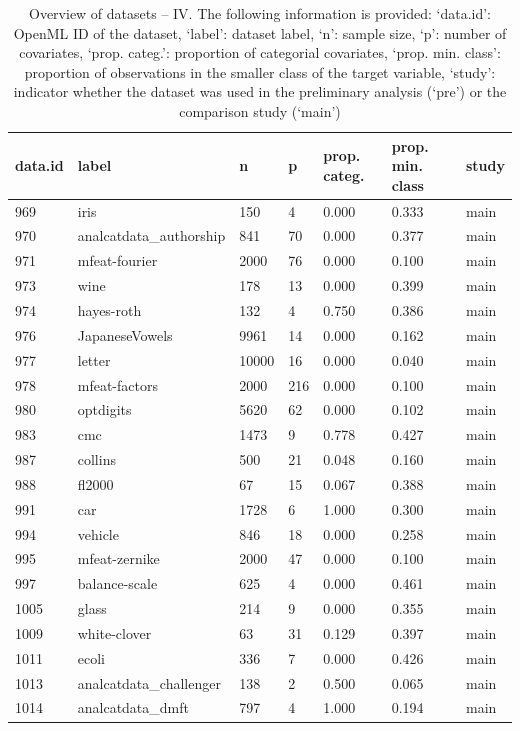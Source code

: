 \begin{table}[!htb]
\caption{Overview of datasets -- IV. The following information is provided: `data.id': OpenML ID of the dataset, `label': dataset label, `n': sample size, `p': number of covariates, `prop. categ.': proportion of categorial covariates, `prop. min. class': proportion of observations in the smaller class of the target variable, `study': indicator whether the dataset was used in the preliminary analysis (`pre') or the comparison study (`main')}
\label{tab:data4}
\begin{tabular}{l | l | l | l | l | l | l}
data.id & label & n & p & prop. categ. & prop. min. class & study \\
\hline
969 & iris & 150 & 4 & 0.000 & 0.333 & main \\
970 & analcatdata\_authorship & 841 & 70 & 0.000 & 0.377 & main \\
971 & mfeat-fourier & 2000 & 76 & 0.000 & 0.100 & main \\
973 & wine & 178 & 13 & 0.000 & 0.399 & main \\
974 & hayes-roth & 132 & 4 & 0.750 & 0.386 & main \\
976 & JapaneseVowels & 9961 & 14 & 0.000 & 0.162 & main \\
977 & letter & 10000 & 16 & 0.000 & 0.040 & main \\
978 & mfeat-factors & 2000 & 216 & 0.000 & 0.100 & main \\
980 & optdigits & 5620 & 62 & 0.000 & 0.102 & main \\
983 & cmc & 1473 & 9 & 0.778 & 0.427 & main \\
987 & collins & 500 & 21 & 0.048 & 0.160 & main \\
988 & fl2000 & 67 & 15 & 0.067 & 0.388 & main \\
991 & car & 1728 & 6 & 1.000 & 0.300 & main \\
994 & vehicle & 846 & 18 & 0.000 & 0.258 & main \\
995 & mfeat-zernike & 2000 & 47 & 0.000 & 0.100 & main \\
997 & balance-scale & 625 & 4 & 0.000 & 0.461 & main \\
1005 & glass & 214 & 9 & 0.000 & 0.355 & main \\
1009 & white-clover & 63 & 31 & 0.129 & 0.397 & main \\
1011 & ecoli & 336 & 7 & 0.000 & 0.426 & main \\
1013 & analcatdata\_challenger & 138 & 2 & 0.500 & 0.065 & main \\
1014 & analcatdata\_dmft & 797 & 4 & 1.000 & 0.194 & main \\

\end{tabular}
\end{table}
